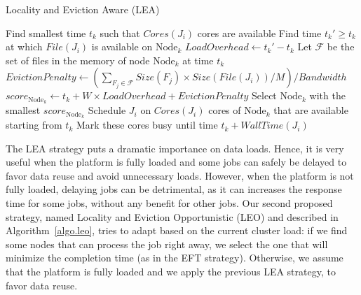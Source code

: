 \documentclass[sigconf,review,anonymous]{acmart}
\newcommand{\Node}[1]{\ensuremath{\mathrm{Node}_{#1}}\xspace}
\newcommand{\file}{\ensuremath{\mathit{File}}\xspace}
\newcommand{\size}{\ensuremath{\mathit{Size}}\xspace}
\newcommand{\memory}{\ensuremath{\mathit{M}}\xspace}
\newcommand{\bandwidth}{\mathit{Bandwidth}\xspace}
\newcommand{\core}{\mathit{Cores}\xspace}
\newcommand{\walltime}{\mathit{WallTime}\xspace}
\newcommand{\nodeset}{\ensuremath{\mathbb{N}}\xspace}
\begin{document}
\begin{algorithm}[t]%
\caption{Locality and Eviction Aware (LEA)}\label{algo.lea}
\begin{algorithmic}[1]
		\ForEach{$\Node{k} \in \nodeset$}
			\State Find smallest time $t_k$ such that $\core(J_i)$ cores are available
			\State Find time $t_k'\geq t_k$ at which $\file(J_i)$ is available on $\Node{k}$
			\State $\mathit{LoadOverhead} \gets t_k' - t_k$ %
                        \State Let $\mathcal{F}$ be the set of files in the memory of node \Node{k} at time $t_k$
			\State $\mathit{EvictionPenalty} \gets (\sum_{F_j\in\mathcal{F}}\size(F_j) \times \size(\file(J_i))/\memory)/\bandwidth$
			\State $score_{\Node{k}} \gets t_k + W \times \mathit{LoadOverhead} + \mathit{EvictionPenalty}$
		\EndFor
                \State Select \Node{k} with the smallest $score_{\Node{k}}$
                \State Schedule $J_i$ on $\core(J_i)$ cores of \Node{k} that are available starting from $t_k$
                \State Mark these cores busy until time $t_k +\walltime(J_i)$
	\EndFor
\end{algorithmic}
\end{algorithm}


The LEA strategy puts a dramatic importance on data loads. Hence, it
is very useful when the platform is fully loaded and  some jobs
can safely be delayed to favor data reuse and avoid
unnecessary loads. However, when the platform is not fully loaded,
delaying jobs can be detrimental, as it can increases the response
time for some jobs, without any benefit for other jobs. Our second proposed strategy,
named Locality and Eviction Opportunistic (LEO) and described in Algorithm~\ref{algo.leo}, tries to adapt based
on the current cluster load: if we find some nodes that can process the job
right away, we select the one that will minimize the completion time
(as in the EFT strategy). Otherwise, we assume that the platform is
fully loaded and we apply the previous LEA strategy, to favor data reuse.
\end{document}
